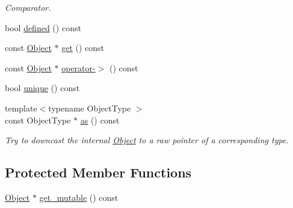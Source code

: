 \begin{DoxyCompactItemize}
\begin{DoxyCompactList}\small\item\em Comparator. \end{DoxyCompactList}\item 
bool \hyperlink{classtvm_1_1runtime_1_1ObjectRef_a79d0ae0a887ed5cbfa67de7d43f0ef3a}{defined} () const 
\item 
const \hyperlink{classtvm_1_1runtime_1_1Object}{Object} $\ast$ \hyperlink{classtvm_1_1runtime_1_1ObjectRef_a11ad7a277c175ee33e1551bbb77a8694}{get} () const 
\item 
const \hyperlink{classtvm_1_1runtime_1_1Object}{Object} $\ast$ \hyperlink{classtvm_1_1runtime_1_1ObjectRef_ab9b1ac131656be45db88e69c04bb16af}{operator-\/$>$} () const 
\item 
bool \hyperlink{classtvm_1_1runtime_1_1ObjectRef_a4142990fd1959abc95aa0cccca4f6cda}{unique} () const 
\item 
{\footnotesize template$<$typename Object\+Type $>$ }\\const Object\+Type $\ast$ \hyperlink{classtvm_1_1runtime_1_1ObjectRef_ab51c99a3607ca95884d9efd978998ce8}{as} () const 
\begin{DoxyCompactList}\small\item\em Try to downcast the internal \hyperlink{classtvm_1_1runtime_1_1Object}{Object} to a raw pointer of a corresponding type. \end{DoxyCompactList}\end{DoxyCompactItemize}
\subsection*{Protected Member Functions}
\begin{DoxyCompactItemize}
\item 
\hyperlink{classtvm_1_1runtime_1_1Object}{Object} $\ast$ \hyperlink{classtvm_1_1runtime_1_1ObjectRef_aa4604d96f4a77cc10cc1e0419758fb2c}{get\+\_\+mutable} () const 
\end{DoxyCompactItemize}
